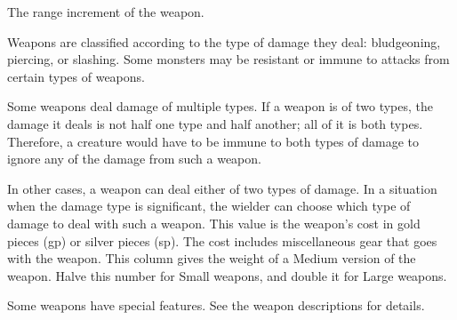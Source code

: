  The range increment of the weapon.

 Weapons are classified according to the type of damage they deal: bludgeoning, piercing, or slashing. Some monsters may be resistant or immune to attacks from certain types of weapons.

Some weapons deal damage of multiple types. If a weapon is of two types, the damage it deals is not half one type and half another; all of it is both types. Therefore, a creature would have to be immune to both types of damage to ignore any of the damage from such a weapon.

In other cases, a weapon can deal either of two types of damage. In a situation when the damage type is significant, the wielder can choose which type of damage to deal with such a weapon.
 This value is the weapon's cost in gold pieces (gp) or silver pieces (sp). The cost includes miscellaneous gear that goes with the weapon.
 This column gives the weight of a Medium version of
the weapon. Halve this number for Small weapons, and double it for
Large weapons.

 Some weapons have special features. See the weapon
descriptions for details.

